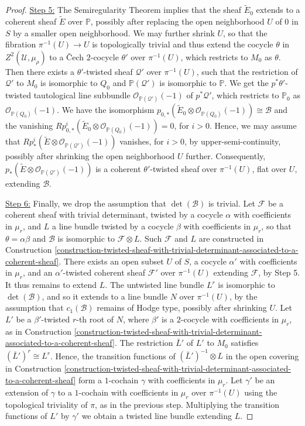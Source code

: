 \documentclass[12pt]{amsart}
\numberwithin{equation}{subsection}
\theoremstyle{plain}
\theoremstyle{definition}
\newcommand{\B}{{\mathcal B}}
\newcommand{\F}{{\mathcal F}}
\newcommand{\Q}{{\mathcal Q}}
\newcommand{\U}{{\mathcal U}}
\newcommand{\PP}{{\mathbb P}}
\newcommand{\StructureSheaf}[1]{{\mathcal O}_{#1}}
\begin{document}
\begin{proof}
\underline{Step 5:}
The Semiregularity Theorem \cite[Th. 5.1]{buchweitz-flenner} implies that the sheaf $\tilde{E}_0$ extends to a coherent sheaf $\tilde{E}$ over $\PP$, possibly after replacing the open neighborhood $U$ of $0$ in $S$ by a smaller open neighborhood. We may further shrink $U$, so that the fibration $\pi^{-1}(U)\rightarrow U$
is topologically trivial and thus extend the cocycle $\theta$ in $Z^2(\U,\mu_\rho)$ to a \v{C}ech $2$-cocycle $\theta'$ over $\pi^{-1}(U)$, which restricts to $M_0$ as $\theta$.
Then there exists a $\theta'$-twisted sheaf $\Q'$ over $\pi^{-1}(U)$, such that the restriction of $\Q'$ to $M_0$ is isomorphic to $Q_0$
and $\PP(\Q')$ is isomorphic to $\PP$. We get the $p^*\theta'$-twisted tautological line subbundle $\StructureSheaf{\PP(\Q')}(-1)$ of $p^*\Q'$, which restricts to $\PP_0$ as $\StructureSheaf{\PP(Q_0)}(-1)$. We have the isomorphism
$p_{0,*}\left(\tilde{E}_0\otimes \StructureSheaf{\PP(Q_0)}(-1)\right)\cong \B$ and the vanishing 
$Rp_{0,*}^i\left(\tilde{E}_0\otimes \StructureSheaf{\PP(Q_0)}(-1)\right)=0$, for $i>0$. Hence, we may assume that 
$Rp_*^i\left(\tilde{E}\otimes \StructureSheaf{\PP(\Q')}(-1)\right)$ vanishes, for $i>0$, by upper-semi-continuity, possibly after shrinking the open neighborhood $U$ further. Consequently, 
$p_*\left(\tilde{E}\otimes \StructureSheaf{\PP(\Q')}(-1)\right)$ is a coherent $\theta'$-twisted sheaf over $\pi^{-1}(U)$, flat over $U$, extending
$\B$.

\underline{Step 6:}
Finally, we drop the assumption that $\det(\B)$ is trivial. Let $\F$ be a coherent sheaf with trivial determinant, twisted by a  cocycle $\alpha$ with coefficients in $\mu_r$,
and $L$ a line bundle twisted by a  cocycle $\beta$ with coefficients in $\mu_r$, so that $\theta=\alpha\beta$ and $\B$ is isomorphic to $\F\otimes L$.
Such $\F$ and $L$ are constructed in Construction \ref{construction-twisted-sheaf-with-trivial-determinant-associated-to-a-coherent-sheaf}.
There exists an open subset $U$ of $S$, a cocycle $\alpha'$ with coefficients in $\mu_r$, and an $\alpha'$-twisted coherent sheaf 
$\F'$ over $\pi^{-1}(U)$ extending $\F$, by Step 5. It thus remains to extend $L$. The untwisted line bundle $L^r$ is isomorphic to $\det(\B)$, and so it extends to a line bundle $N$ over $\pi^{-1}(U)$, by the assumption that $c_1(\B)$ remains of Hodge type, possibly after shrinking $U$. Let $L'$ be  a $\beta'$-twisted $r$-th root of $N$, where $\beta'$ is a $2$-cocycle with coefficients in $\mu_r$, as in 
Construction \ref{construction-twisted-sheaf-with-trivial-determinant-associated-to-a-coherent-sheaf}. The restriction $\bar{L}'$ of $L'$
to $M_0$ satisfies $(\bar{L}')^r\cong L^r$. Hence, the transition functions of $(\bar{L}')^{-1}\otimes L$ in the open covering in Construction 
\ref{construction-twisted-sheaf-with-trivial-determinant-associated-to-a-coherent-sheaf} form a $1$-cochain $\gamma$ with coefficients in $\mu_r$. Let $\gamma'$ be an extension of $\gamma$ to a $1$-cochain with coefficients in $\mu_r$ over $\pi^{-1}(U)$ using the topological triviality of $\pi$, as in the previous step. Multiplying the transition functions of $L'$ by $\gamma'$ we obtain a twisted line bundle extending $L$.
\end{proof}
\end{document}
